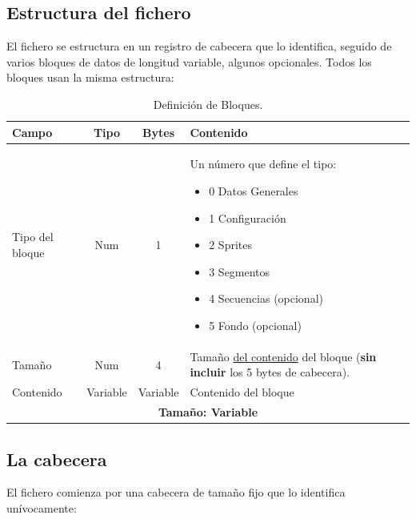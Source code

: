 \subsection{Estructura del fichero}
\label{sec:A02GWCEstructura}

El fichero se estructura en un registro de cabecera que lo identifica, seguido de varios bloques de datos de longitud variable, algunos opcionales. Todos los bloques usan la misma estructura:

\begin{table}[H]
	\centering
	\begin{tabular}{|l|c|c|p{8.4cm}|}
		\hline
		\textbf{Campo} & \textbf{Tipo} & \textbf{Bytes} & \textbf{Contenido} \\
		\hline
		
		Tipo del bloque & Num & 1 & Un número que define el tipo:
		\begin{itemize}
			\item 0 Datos Generales
			\item 1 Configuración
			\item 2 Sprites
			\item 3 Segmentos
			\item 4 Secuencias (opcional)
			\item 5 Fondo (opcional)
		\end{itemize} \\ \hline
		
		Tamaño & Num & 4 & Tamaño \underline{del contenido} del bloque (\textbf{sin incluir} los 5 bytes de cabecera).\\ \hline
		
		Contenido & Variable & Variable & Contenido del bloque \\
		
		\hline\hline
		\multicolumn{4}{c}{\textbf{Tamaño: Variable}} \\ \hline
	\end{tabular}
	\caption{Definición de Bloques.}
	\label{tab:A02DefBloques}
\end{table}

\subsection{La cabecera}
\label{sec:A02GWCCabecera}

El fichero comienza por una cabecera de tamaño fijo que lo identifica unívocamente:

